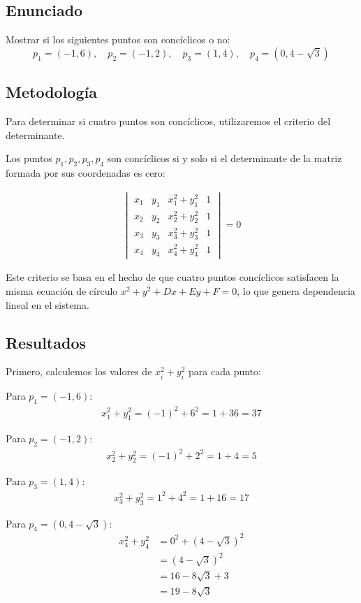 \documentclass{article}
\begin{document}
\subsection{Enunciado}
Mostrar si los siguientes puntos son concíclicos o no:
$$p_1 = (-1, 6), \quad p_2 = (-1, 2), \quad p_3 = (1, 4), \quad p_4 = (0, 4 - \sqrt{3})$$

\subsection{Metodología}
Para determinar si cuatro puntos son concíclicos, utilizaremos el criterio del determinante. 

Los puntos $p_1, p_2, p_3, p_4$ son concíclicos si y solo si el determinante de la matriz formada por sus coordenadas es cero:

\begin{align}
\begin{vmatrix}
x_1 & y_1 & x_1^2 + y_1^2 & 1 \\
x_2 & y_2 & x_2^2 + y_2^2 & 1 \\
x_3 & y_3 & x_3^2 + y_3^2 & 1 \\
x_4 & y_4 & x_4^2 + y_4^2 & 1
\end{vmatrix} = 0
\end{align}

Este criterio se basa en el hecho de que cuatro puntos concíclicos satisfacen la misma ecuación de círculo $x^2 + y^2 + Dx + Ey + F = 0$, lo que genera dependencia lineal en el sistema.

\subsection{Resultados}
\setcounter{equation}{0}

Primero, calculemos los valores de $x_i^2 + y_i^2$ para cada punto:

Para $p_1 = (-1, 6)$:
\begin{align}
x_1^2 + y_1^2 = (-1)^2 + 6^2 = 1 + 36 = 37
\end{align}

Para $p_2 = (-1, 2)$:
\begin{align}
x_2^2 + y_2^2 = (-1)^2 + 2^2 = 1 + 4 = 5
\end{align}

Para $p_3 = (1, 4)$:
\begin{align}
x_3^2 + y_3^2 = 1^2 + 4^2 = 1 + 16 = 17
\end{align}

Para $p_4 = (0, 4 - \sqrt{3})$:
\begin{align}
x_4^2 + y_4^2 &= 0^2 + (4 - \sqrt{3})^2 \\
&= (4 - \sqrt{3})^2 \\
&= 16 - 8\sqrt{3} + 3 \\
&= 19 - 8\sqrt{3}
\end{align}
\end{document}
